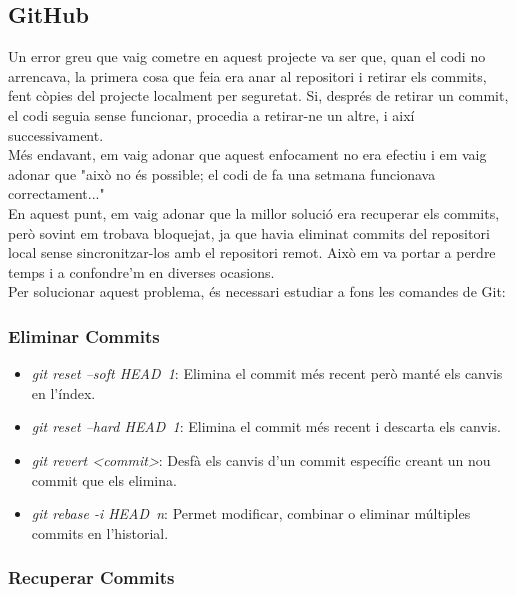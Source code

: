 \documentclass[a4paper,12pt,twoside]{ThesisStyle}
\begin{document}
\subsection{GitHub}
\label{subsec: GitHub}

Un error greu que vaig cometre en aquest projecte va ser que, quan el codi no arrencava, la primera cosa que feia era anar al repositori i retirar els commits, fent còpies del projecte localment per seguretat. Si, després de retirar un commit, el codi seguia sense funcionar, procedia a retirar-ne un altre, i així successivament.\\

Més endavant, em vaig adonar que aquest enfocament no era efectiu i em vaig adonar que "això no és possible; el codi de fa una setmana funcionava correctament..."\\

En aquest punt, em vaig adonar que la millor solució era recuperar els commits, però sovint em trobava bloquejat, ja que havia eliminat commits del repositori local sense sincronitzar-los amb el repositori remot. Això em va portar a perdre temps i a confondre'm en diverses ocasions.\\

Per solucionar aquest problema, és necessari estudiar a fons les comandes de Git:


\subsubsection{Eliminar Commits}

\begin{itemize}
    \item \textit{git reset --soft HEAD~1}: Elimina el commit més recent però manté els canvis en l'índex.
    \item \textit{git reset --hard HEAD~1}: Elimina el commit més recent i descarta els canvis.
    \item \textit{git revert <commit>}: Desfà els canvis d'un commit específic creant un nou commit que els elimina.
    \item \textit{git rebase -i HEAD~n}: Permet modificar, combinar o eliminar múltiples commits en l'historial.
  \end{itemize}

\subsubsection{Recuperar Commits}
\end{document}
